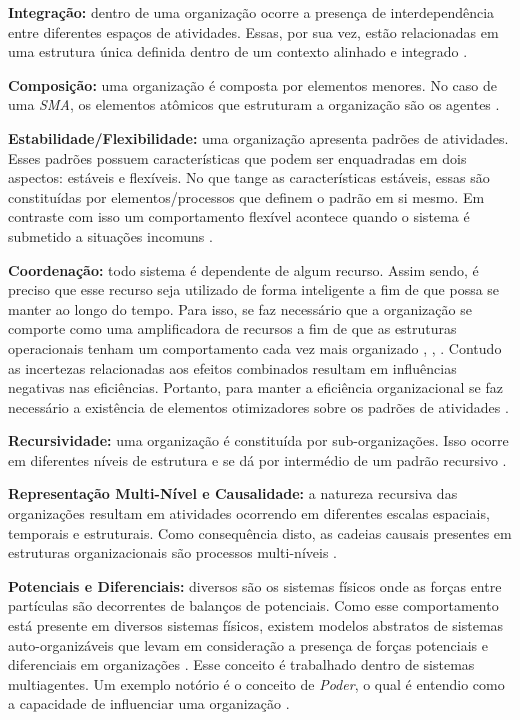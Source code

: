 \textbf{Integração:} dentro de uma organização ocorre a presença de interdependência entre diferentes espaços de atividades. Essas, por sua vez, estão relacionadas em uma estrutura única definida dentro de um contexto alinhado e integrado \cite{organiationofmultiagentsystem}.

\textbf{Composição:} uma organização é composta por elementos menores. No caso de uma \textit{SMA}, os elementos atômicos que estruturam a organização são os agentes \cite{organiationofmultiagentsystem}.

\textbf{Estabilidade/Flexibilidade:} uma organização apresenta padrões de atividades. Esses padrões possuem características que podem ser enquadradas em dois aspectos: estáveis e flexíveis. No que tange as características estáveis, essas são constituídas por elementos/processos que definem o padrão em si mesmo. Em contraste com isso um comportamento flexível acontece quando o sistema é submetido a situações incomuns \cite{organiationofmultiagentsystem}.

\textbf{Coordenação:} todo sistema é dependente de algum recurso. Assim sendo, é preciso que esse recurso seja utilizado de forma inteligente a fim de que possa se manter ao longo do tempo. Para isso, se faz necessário que a organização se comporte como uma amplificadora de recursos a fim de que as estruturas operacionais tenham um comportamento cada vez mais organizado \cite{selforganization}, \cite{selforganizatioenvoriment}, \cite{defintionselforganization}. Contudo as incertezas relacionadas aos efeitos combinados resultam em influências negativas nas eficiências. Portanto, para manter a eficiência organizacional se faz necessário a existência de elementos otimizadores sobre os padrões de atividades \cite{organiationofmultiagentsystem}.

\textbf{Recursividade:} uma organização é constituída por sub-organizações. Isso ocorre em diferentes níveis de estrutura e se dá por intermédio de um padrão recursivo \cite{organiationofmultiagentsystem}.

\textbf{Representação Multi-Nível e Causalidade:} a natureza recursiva das organizações resultam em atividades ocorrendo em diferentes escalas espaciais, temporais e estruturais. Como consequência disto, as cadeias causais presentes em estruturas organizacionais são processos multi-níveis \cite{organiationofmultiagentsystem}.

\textbf{Potenciais e Diferenciais:} diversos são os sistemas físicos onde as forças entre partículas são decorrentes de balanços de potenciais. Como esse comportamento está presente em diversos sistemas físicos, existem modelos abstratos de sistemas auto-organizáveis que levam em consideração a presença de forças potenciais e diferenciais em organizações \cite{selforganizationdiffforce}. Esse conceito é trabalhado dentro de sistemas multiagentes. Um exemplo notório é o conceito de \textit{Poder}, o qual é entendio como a capacidade de influenciar uma organização \cite{organiationofmultiagentsystem}.

